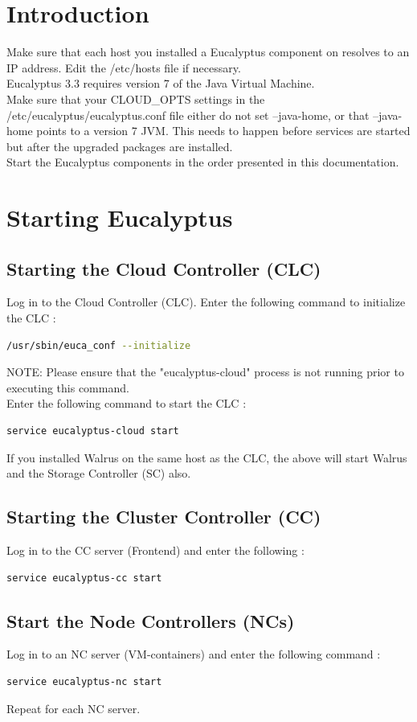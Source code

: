 \section{Introduction}
Make sure that each host you installed a Eucalyptus component on resolves to an IP address. Edit the /etc/hosts file if necessary. \\
Eucalyptus 3.3 requires version 7 of the Java Virtual Machine. \\
Make sure that your CLOUD\_OPTS settings in the /etc/eucalyptus/eucalyptus.conf file either do not set --java-home, or that --java-home points to a version 7 JVM. This needs to happen before services are started but after the upgraded packages are installed.\\
Start the Eucalyptus components in the order presented in this documentation.
\section{Starting Eucalyptus}
\subsection{Starting the Cloud Controller (CLC)}

Log in to the Cloud Controller (CLC).
Enter the following command to initialize the CLC :
\begin{lstlisting}[language=bash]
/usr/sbin/euca_conf --initialize
\end{lstlisting}
NOTE: Please ensure that the "eucalyptus-cloud" process is not running prior to executing this command.\\ \linebreak
Enter the following command to start the CLC : 
\begin{lstlisting}[language=bash]
service eucalyptus-cloud start
\end{lstlisting}
If you installed Walrus on the same host as the CLC, the above will start Walrus and the Storage Controller (SC) also.
\subsection{Starting the Cluster Controller (CC)}
Log in to the CC server (Frontend) and enter the following :
\begin{lstlisting}[language=bash]
service eucalyptus-cc start
\end{lstlisting}
\subsection{Start the Node Controllers (NCs)}
Log in to an NC server (VM-containers) and enter the following command :
\begin{lstlisting}[language=bash]
service eucalyptus-nc start
\end{lstlisting}
Repeat for each NC server.
